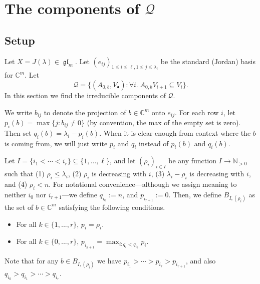 \documentclass[12pt,psamsfonts]{article}
\DeclareMathOperator{\gl}{\mathfrak{gl}}
\begin{document}
\section{The components of \texorpdfstring{\(\mathcal{Q}\)}{Q}}\label{q_comp}
\subsection{Setup}
Let \(X = J(\lambda) \in \gl_m\).
Let \((e_{ij})_{1 \leq i \leq \ell, 1 \leq j \leq \lambda_i}\) be the standard (Jordan) basis for \(\mathbb{C}^m\).
Let
\[\mathcal{Q} = \{(A_{0,b}, V_\bullet) : \forall i. \; A_{0,b} V_{i + 1} \subseteq V_i\}.\]
In this section we find the irreducible components of \(\mathcal{Q}\).
\par We write \(b_{ij}\) to denote the projection of \(b \in \mathbb{C}^m\) onto \(e_{ij}\).
For each row \(i\), let \(p_i(b) = \max\{j : b_{ij} \neq 0\}\) (by convention, the max of the empty set is zero).
Then set \(q_i(b) = \lambda_i - p_i(b)\).
When it is clear enough from context where the \(b\) is coming from, we will just write \(p_i\) and \(q_i\) instead of \(p_i(b)\) and \(q_i(b)\).
\par Let \(I = \{i_1 < \cdots < i_r\} \subseteq \{1, ..., \ell\}\), and let \((\rho_i)_{i \in I}\) be any function \(I \to \mathbb{N}_{> 0}\) such that (1) \(\rho_i \leq \lambda_i\), (2) \(\rho_i\) is decreasing with \(i\), (3) \(\lambda_i - \rho_i\) is decreasing with \(i\), and (4) \(\rho_i < n\).
For notational convenience---although we assign meaning to neither \(i_0\) nor \(i_{r + 1}\)---we define \(q_{i_0} := n\), and \(p_{i_{r + 1}} := 0\).
Then, we define \(B_{I, (\rho_i)}\) as the set of \(b \in \mathbb{C}^m\) satisfying the following conditions.
\begin{itemize}
    \item For all \(k \in \{1, ..., r\}\), \(p_i = \rho_i\).
    \item For all \(k \in \{0, ..., r\}\), \(p_{i_{k + 1}} = \max_{i : q_i < q_{i_k}} p_i\).
\end{itemize}
Note that for any \(b \in B_{I, (\rho_i)}\) we have \(p_{i_1} > \cdots > p_{i_r} > p_{i_{r + 1}}\), and also \(q_{i_0} > q_{i_1} > \cdots > q_{i_r}\).
\end{document}
